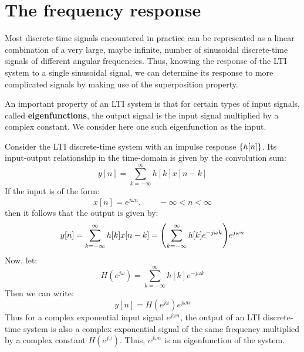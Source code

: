 \documentclass[../../main/main.tex]{subfiles}
\begin{document}
\section{The frequency response}
Most discrete-time signals encountered in practice can be represented as a linear combination of a very large, maybe infinite, number of sinusoidal discrete-time signals of different angular frequencies. Thus, knowing the response of the LTI system to a single sinusoidal signal, we can determine its response to more complicated signals by making use of the superposition property.

An important property of an LTI system is that for certain types of input signals, called \textbf{eigenfunctions}, the output signal is the input signal multiplied by a complex constant. We consider here one such eigenfunction as the input.

Consider the LTI discrete-time system with an impulse response \( \qty{h[n]} \). Its input-output relationship in the time-domain is given by the convolution sum:
\begin{equation}
    y[n]
    =
    \sum_{k=-\infty}^{\infty} h[k] x[n-k]
    \label{eq:L09_S32_1}
\end{equation}
If the input is of the form:
\begin{equation}
    x[n]
    =
    e^{j\omega n},
    \qquad
    -\infty < n < \infty
    \label{eq:L09_S33_1}
\end{equation}
then it follows that the output is given by:
\begin{equation}
    y[n]
    =
    \sum_{k=-\infty}^{\infty} h[k] x[n-k]
    =
    \qty( \sum_{k=-\infty}^{\infty} h[k]e^{-j\omega k} ) e^{j\omega n}
    \label{eq:L09_S33_2}
\end{equation}
Now, let:
\begin{equation}
    H(e^{j\omega})
    =
    \sum_{k=-\infty}^{\infty} h[k]e^{-j\omega k}
    \label{eq:L09_S33_3}
\end{equation}
Then we can write:
\begin{equation}
    y[n]
    =
    H(e^{j\omega}) e^{j\omega n}
    \label{eq:L09_S34_1}
\end{equation}
Thus for a complex exponential input signal \( e^{j\omega n} \), the output of an LTI discrete-time system is also a complex exponential signal of the same frequency multiplied by a complex constant \( H(e^{j\omega}) \). Thus, \( e^{j\omega n} \) is an eigenfunction of the system.
\end{document}
